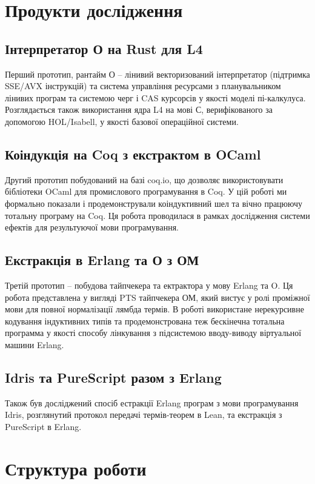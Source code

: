 \newpage
\section{Продукти дослідження}

\subsection{Інтерпретатор О на Rust для L4}
Перший прототип, рантайм О -- лінивий
векторизований інтерпретатор (підтримка SSE/AVX інструкцій) та система
управління ресурсами з планувальником лінивих програм
та системою черг і CAS курсорсів у якості моделі пі-калкулуса. Розглядається також
використання ядра L4 на мові С, верифікованого за допомогою HOL/Isabell,
у якості базової операційної системи.

\subsection{Коіндукція на Coq з екстрактом в OCaml}
Другий прототип побудований на базі coq.io, що дозволяє
використовувати бібліотеки OCaml для промислового програмування в Coq.
У цій роботі ми формально показали і продемонстрували коіндуктивний шел
та вічно працюючу тотальну програму на Coq. Ця робота проводилася
в рамках дослідження системи ефектів для результуючої мови програмування.

\subsection{Екстракція в Erlang та О з ОМ}
Третій прототип -- побудова тайпчекера та ектрактора у мову Erlang та O.
Ця робота представлена у вигляді PTS тайпчекера ОМ, який вистує у ролі
проміжної мови для повної нормалізації лямбда термів. В роботі використане
нерекурсивне кодування індуктивних типів та продемонстрована теж бескінечна
тотальна программа у якості способу лінкування з підсистемою вводу-виводу
віртуальної машини Erlang.

\subsection*{Idris та PureScript разом з Erlang}
Також був досліджений спосіб естракції Erlang програм з мови програмування
Idris, розглянутий протокол передачі термів-теорем в Lean,
та екстракція з PureScript в Erlang.

\section{Структура роботи}

